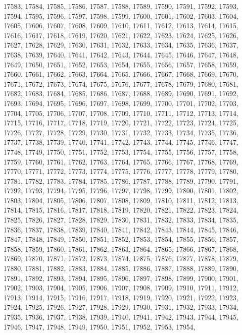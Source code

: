 17583,
17584,
17585,
17586,
17587,
17588,
17589,
17590,
17591,
17592,
17593,
17594,
17595,
17596,
17597,
17598,
17599,
17600,
17601,
17602,
17603,
17604,
17605,
17606,
17607,
17608,
17609,
17610,
17611,
17612,
17613,
17614,
17615,
17616,
17617,
17618,
17619,
17620,
17621,
17622,
17623,
17624,
17625,
17626,
17627,
17628,
17629,
17630,
17631,
17632,
17633,
17634,
17635,
17636,
17637,
17638,
17639,
17640,
17641,
17642,
17643,
17644,
17645,
17646,
17647,
17648,
17649,
17650,
17651,
17652,
17653,
17654,
17655,
17656,
17657,
17658,
17659,
17660,
17661,
17662,
17663,
17664,
17665,
17666,
17667,
17668,
17669,
17670,
17671,
17672,
17673,
17674,
17675,
17676,
17677,
17678,
17679,
17680,
17681,
17682,
17683,
17684,
17685,
17686,
17687,
17688,
17689,
17690,
17691,
17692,
17693,
17694,
17695,
17696,
17697,
17698,
17699,
17700,
17701,
17702,
17703,
17704,
17705,
17706,
17707,
17708,
17709,
17710,
17711,
17712,
17713,
17714,
17715,
17716,
17717,
17718,
17719,
17720,
17721,
17722,
17723,
17724,
17725,
17726,
17727,
17728,
17729,
17730,
17731,
17732,
17733,
17734,
17735,
17736,
17737,
17738,
17739,
17740,
17741,
17742,
17743,
17744,
17745,
17746,
17747,
17748,
17749,
17750,
17751,
17752,
17753,
17754,
17755,
17756,
17757,
17758,
17759,
17760,
17761,
17762,
17763,
17764,
17765,
17766,
17767,
17768,
17769,
17770,
17771,
17772,
17773,
17774,
17775,
17776,
17777,
17778,
17779,
17780,
17781,
17782,
17783,
17784,
17785,
17786,
17787,
17788,
17789,
17790,
17791,
17792,
17793,
17794,
17795,
17796,
17797,
17798,
17799,
17800,
17801,
17802,
17803,
17804,
17805,
17806,
17807,
17808,
17809,
17810,
17811,
17812,
17813,
17814,
17815,
17816,
17817,
17818,
17819,
17820,
17821,
17822,
17823,
17824,
17825,
17826,
17827,
17828,
17829,
17830,
17831,
17832,
17833,
17834,
17835,
17836,
17837,
17838,
17839,
17840,
17841,
17842,
17843,
17844,
17845,
17846,
17847,
17848,
17849,
17850,
17851,
17852,
17853,
17854,
17855,
17856,
17857,
17858,
17859,
17860,
17861,
17862,
17863,
17864,
17865,
17866,
17867,
17868,
17869,
17870,
17871,
17872,
17873,
17874,
17875,
17876,
17877,
17878,
17879,
17880,
17881,
17882,
17883,
17884,
17885,
17886,
17887,
17888,
17889,
17890,
17891,
17892,
17893,
17894,
17895,
17896,
17897,
17898,
17899,
17900,
17901,
17902,
17903,
17904,
17905,
17906,
17907,
17908,
17909,
17910,
17911,
17912,
17913,
17914,
17915,
17916,
17917,
17918,
17919,
17920,
17921,
17922,
17923,
17924,
17925,
17926,
17927,
17928,
17929,
17930,
17931,
17932,
17933,
17934,
17935,
17936,
17937,
17938,
17939,
17940,
17941,
17942,
17943,
17944,
17945,
17946,
17947,
17948,
17949,
17950,
17951,
17952,
17953,
17954,
